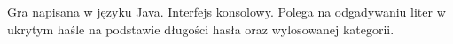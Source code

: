 Gra napisana w języku Java. Interfejs konsolowy. Polega na odgadywaniu liter w ukrytym haśle na podstawie długości hasła oraz wylosowanej kategorii. 